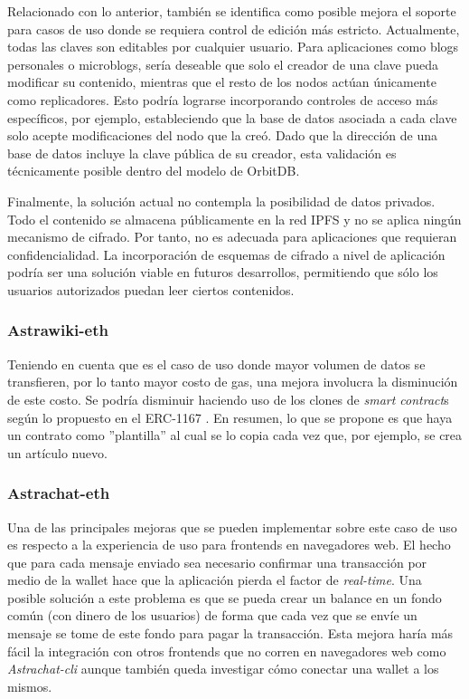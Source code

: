 Relacionado con lo anterior, también se identifica como posible mejora el soporte para casos de uso donde se requiera control de edición más estricto. Actualmente, todas las claves son editables por cualquier usuario. Para aplicaciones como blogs personales o microblogs, sería deseable que solo el creador de una clave pueda modificar su contenido, mientras que el resto de los nodos actúan únicamente como replicadores. Esto podría lograrse incorporando controles de acceso más específicos, por ejemplo, estableciendo que la base de datos asociada a cada clave solo acepte modificaciones del nodo que la creó. Dado que la dirección de una base de datos incluye la clave pública de su creador, esta validación es técnicamente posible dentro del modelo de OrbitDB.

Finalmente, la solución actual no contempla la posibilidad de datos privados. Todo el contenido se almacena públicamente en la red IPFS y no se aplica ningún mecanismo de cifrado. Por tanto, no es adecuada para aplicaciones que requieran confidencialidad. La incorporación de esquemas de cifrado a nivel de aplicación podría ser una solución viable en futuros desarrollos, permitiendo que sólo los usuarios autorizados puedan leer ciertos contenidos.

\subsubsection{Astrawiki-eth}

Teniendo en cuenta que es el caso de uso donde mayor volumen de datos se transfieren, por lo tanto mayor costo de gas, una mejora involucra la disminución de este costo. Se podría disminuir haciendo uso de los clones de \textit{smart contract}s según lo propuesto en el ERC-1167 \cite{erc-1167}. En resumen, lo que se propone es que haya un contrato como ''plantilla'' al cual se lo copia cada vez que, por ejemplo, se crea un artículo nuevo.

\subsubsection{Astrachat-eth}

Una de las principales mejoras que se pueden implementar sobre este caso de uso es respecto a la experiencia de uso para frontends en navegadores web. El hecho que para cada mensaje enviado sea necesario confirmar una transacción por medio de la wallet hace que la aplicación pierda el factor de \textit{real-time}. Una posible solución a este problema es que se pueda crear un balance en un fondo común (con dinero de los usuarios) de forma que cada vez que se envíe un mensaje se tome de este fondo para pagar la transacción. Esta mejora haría más fácil la integración con otros frontends que no corren en navegadores web como \textit{Astrachat-cli} aunque también queda investigar cómo conectar una wallet a los mismos.

